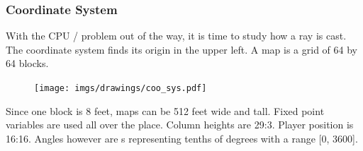\subsubsection{Coordinate System}
With the CPU / problem out of the way, it is time to study how a ray is cast. The coordinate system finds its origin in the upper left. A map is a grid of 64 by 64 blocks. 
\begin{figure}[H]
  \centering
 \texttt{[image: imgs/drawings/coo\_sys.pdf]}
\end{figure}
\par
Since one block is 8 feet, maps can be 512 feet wide and tall. Fixed point variables are used all over the place. Column heights are 29:3. Player position is 16:16. Angles however are s representing tenths of degrees with a range [0, 3600].

















